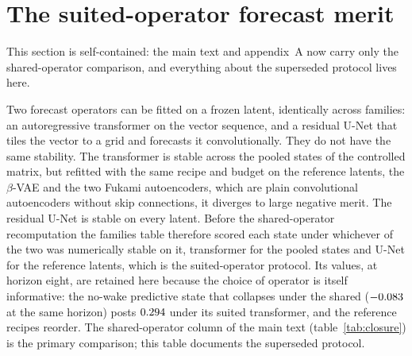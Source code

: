 
\section{The suited-operator forecast merit}
\label{s:suited_merit}

This section is self-contained: the main text and appendix~A now carry only
the shared-operator comparison, and everything about the superseded protocol
lives here.

Two forecast operators can be fitted on a frozen latent, identically across
families: an autoregressive transformer on the vector sequence, and a residual
U-Net that tiles the vector to a grid and forecasts it convolutionally. They do
not have the same stability. The transformer is stable across the pooled states
of the controlled matrix, but refitted with the same recipe and budget on the
reference latents, the $\beta$-VAE and the two Fukami autoencoders, which are
plain convolutional autoencoders without skip connections, it diverges to large
negative merit. The residual U-Net is stable on every latent. Before the
shared-operator recomputation the families table therefore scored each state
under whichever of the two was numerically stable on it, transformer for the
pooled states and U-Net for the reference latents, which is the suited-operator
protocol. Its values, at horizon eight, are retained here
because the choice of operator is itself informative: the no-wake
predictive state that collapses under the shared \DirectFC{}
($-0.083$ at the same horizon) posts $0.294$
under its suited transformer, and the reference recipes reorder. The
shared-operator column of the main text (table~\ref{tab:closure}) is the
primary comparison; this table documents the superseded protocol.

